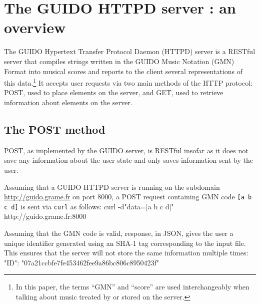 \documentclass[11pt,a4paper]{article}
\newenvironment{code}		{\vspace{-2mm} \fontsize{8.5pt}{12pt}\selectfont \verbatim}{\endverbatim\vspace{-2mm}}
\begin{document}
\section{The GUIDO HTTPD server : an overview}\label{section:overview}
The GUIDO Hypertext Transfer Protocol Daemon (HTTPD) server is a RESTful server that compiles strings written in the GUIDO Music Notation (GMN) Format into musical scores and reports to the client several representations of this data.\footnote{In this paper, the terms ``GMN'' and ``score'' are used interchangeably when talking about music treated by or stored on the server.}  It accepts user requests via two main methods of the HTTP protocol: POST, used to place elements on the server, and GET, used to retrieve information about elements on the server.

\subsection{The POST method}\label{subsection:post}
POST, as implemented by the GUIDO server, is RESTful insofar as it does not save any information about the user state and only saves information sent by the user.\par
Assuming that a GUIDO HTTPD server is running on the subdomain \url{http://guido.grame.fr} on port 8000, a POST request containing GMN code \verb=[a b c d]= is sent via \verb=curl= as follows:
\begin{code}
 curl -d"data=[a b c d]" http://guido.grame.fr:8000
\end{code}

Assuming that the GMN code is valid, response, in JSON, gives the user a unique identifier generated using an SHA-1 tag corresponding to the input file.  This ensures that the server will not store the same information multiple times:
\begin{code}
 {
  "ID": "07a21ccbfe7fe453462fee9a86bc806c8950423f"
 }
\end{code}
\end{document}
